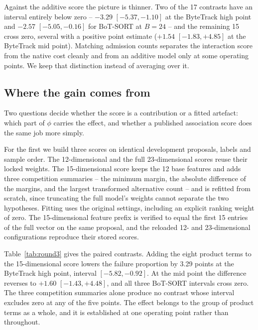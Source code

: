 Against the additive score the picture is thinner. Two of the 17 contrasts
have an interval entirely below zero -- $-3.29$ $[-5.37,-1.10]$ at the
ByteTrack high point and $-2.57$ $[-5.05,-0.16]$ for BoT-SORT at $B=24$ --
and the remaining 15 cross zero, several with a positive point estimate
($+1.54$ $[-1.83,+4.85]$ at the ByteTrack mid point). Matching admission
counts separates the interaction score from the native cost cleanly and
from an additive model only at some operating points. We keep that
distinction instead of averaging over it.

\subsection{Where the gain comes from}
\label{sec:ablation}

Two questions decide whether the score is a contribution or a fitted
artefact: which part of $\phi$ carries the effect, and whether a published
association score does the same job more simply.

For the first we build three scores on identical development proposals,
labels and sample order. The 12-dimensional and the full 23-dimensional
scores reuse their locked weights. The 15-dimensional score keeps the 12
base features and adds three competition summaries -- the minimum margin,
the absolute difference of the margins, and the largest transformed
alternative count -- and is refitted from scratch, since truncating the
full model's weights cannot separate the two hypotheses. Fitting uses the
original settings, including an explicit ranking weight of zero. The
15-dimensional feature prefix is verified to equal the first 15 entries of
the full vector on the same proposal, and the reloaded 12- and
23-dimensional configurations reproduce their stored scores.

Table~\ref{tab:round3} gives the paired contrasts. Adding the eight product
terms to the 15-dimensional score lowers the failure proportion by 3.29
points at the ByteTrack high point, interval $[-5.82,-0.92]$. At the mid
point the difference reverses to $+1.60$ $[-1.43,+4.48]$, and all three
BoT-SORT intervals cross zero. The three competition summaries alone
produce no contrast whose interval excludes zero at any of the five
points. The effect belongs to the group of product terms as a whole, and
it is established at one operating point rather than throughout.

